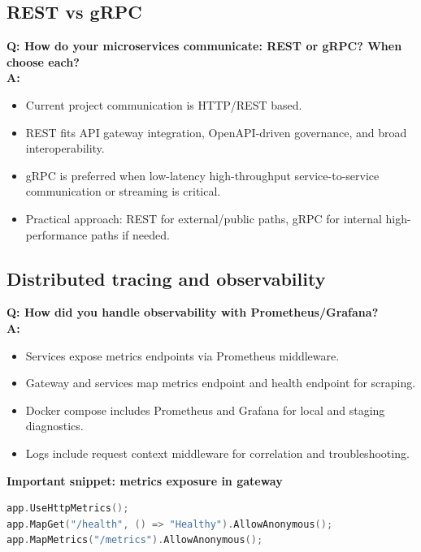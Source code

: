 \documentclass[11pt,a4paper]{article}
\begin{document}
\subsection{REST vs gRPC}
\textbf{Q: How do your microservices communicate: REST or gRPC? When choose each?}\\
\textbf{A:}
\begin{itemize}[leftmargin=*]
  \item Current project communication is HTTP/REST based.
  \item REST fits API gateway integration, OpenAPI-driven governance, and broad interoperability.
  \item gRPC is preferred when low-latency high-throughput service-to-service communication or streaming is critical.
  \item Practical approach: REST for external/public paths, gRPC for internal high-performance paths if needed.
\end{itemize}

\subsection{Distributed tracing and observability}
\textbf{Q: How did you handle observability with Prometheus/Grafana?}\\
\textbf{A:}
\begin{itemize}[leftmargin=*]
  \item Services expose metrics endpoints via Prometheus middleware.
  \item Gateway and services map metrics endpoint and health endpoint for scraping.
  \item Docker compose includes Prometheus and Grafana for local and staging diagnostics.
  \item Logs include request context middleware for correlation and troubleshooting.
\end{itemize}

\textbf{Important snippet: metrics exposure in gateway}\newline
\begin{lstlisting}[style=code,language=C]
app.UseHttpMetrics();
app.MapGet("/health", () => "Healthy").AllowAnonymous();
app.MapMetrics("/metrics").AllowAnonymous();
\end{lstlisting}
\end{document}
